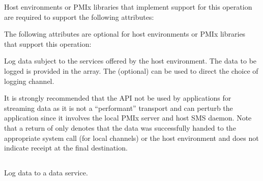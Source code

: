 \divider

Host environments or \ac{PMIx} libraries that implement support for this operation are required to support the following attributes:


\reqattrend

\optattrstart
The following attributes are optional for host environments or \ac{PMIx} libraries that support this operation:


\optattrend

\descr

Log data subject to the services offered by the host environment. The data to be logged is provided in the  array. The (optional)  can be used to direct the choice of logging channel.

\adviceuserstart
It is strongly recommended that the  API not be used by applications for streaming data as it is not a ``performant'' transport and can perturb the application since it involves the local \ac{PMIx} server and host \ac{SMS} daemon. Note that a return of  only denotes that the data was successfully handed to the appropriate system call (for local channels) or the host environment and does not indicate receipt at the final destination.
\adviceuserend

%
\subsection{}

\summary

Log data to a data service.

